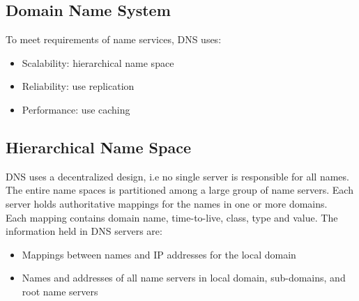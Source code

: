 \begin{multicols*}{2}
\section{Domain Name System}

\noindent To meet requirements of name services, DNS uses:
\begin{itemize}
  \item Scalability: hierarchical name space
  \item Reliability: use replication
  \item Performance: use caching
\end{itemize}

\subsection{Hierarchical Name Space}

\begin{center}
\end{center}

\noindent DNS uses a decentralized design, i.e no single server is responsible for all names. The entire name spaces is partitioned among a large group of name servers. Each server holds authoritative mappings for the names in one or more domains. \\

\noindent Each mapping contains domain name, time-to-live, class, type and value. The information held in DNS servers are:
\begin{itemize}
  \item Mappings between names and IP addresses for the local domain
  \item Names and addresses of all name servers in local domain, sub-domains, and root name servers
\end{itemize}


\end{multicols*}
